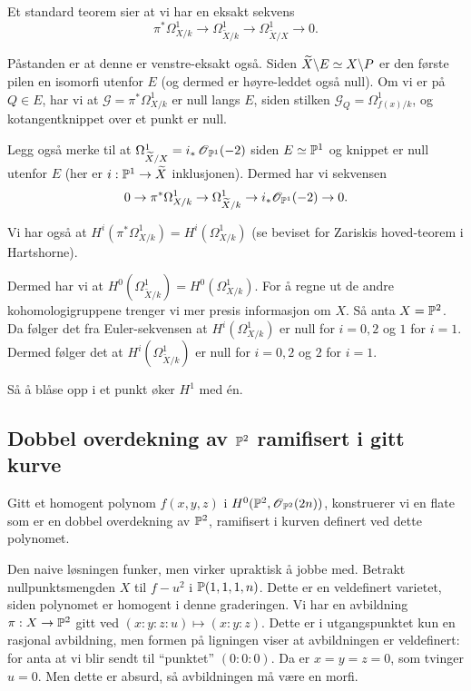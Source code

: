 \documentclass[11pt, norsk]{article}
\begin{document}
Et standard teorem sier at vi har en eksakt sekvens
$$
\pi^\ast \Omega^1_{X/k} \to \Omega^1_{\widetilde X/k} \to \Omega^1_{\widetilde X/X} \to 0.
$$

Påstanden er at denne er venstre-eksakt også. Siden $\widetilde X \backslash E \simeq X \backslash P$ er den første pilen en isomorfi utenfor $E$ (og dermed er høyre-leddet også null). Om vi er på $Q \in E$, har vi at $\mathscr G = {\pi^\ast \Omega_{X/k}^1}$ er null langs $E$, siden stilken $\mathscr G_Q=\Omega_{f(x)/k}^1$, og kotangentknippet over et punkt er null.

Legg også merke til at $\Omega^1_{\widetilde X/X}=i_\ast \operatorname{\mathscr{O}}_{\mathbb{P}^1}(-2)$ siden $E \simeq \mathbb{P}^1$ og knippet er null utenfor $E$ (her er $i:\mathbb{P}^1 \to \widetilde X$ inklusjonen). Dermed har vi sekvensen
$$
0 \to \pi^\ast \Omega^1_{X/k} \to \Omega^1_{\widetilde X/k} \to i_\ast \mathscr O_{\mathbb{P}^1} (-2) \to 0.
$$

Vi har også at $H^i(\pi^\ast \Omega^1_{X/k})= H^i(\Omega_{X/k}^1)$ (se beviset for Zariskis hoved-teorem i Hartshorne).

Dermed har vi at $H^0(\Omega_{\widetilde X/k}^1) = H^0(\Omega_{X/k}^1)$. For å regne ut de andre kohomologigruppene trenger vi mer presis informasjon om $X$. Så anta $X= \mathbb{P}^2$. Da følger det fra Euler-sekvensen at $H^i(\Omega_{X/k}^1)$ er null for $i=0,2$ og $1$ for $i=1$. Dermed følger det at $H^i(\Omega_{\widetilde X/k}^1)$ er null for $i=0,2$ og $2$ for $i=1$.

Så å blåse opp i et punkt øker $H^1$ med én.

\subsection{Dobbel overdekning av $\mathbb{P}^2$ ramifisert i gitt kurve}

Gitt et homogent polynom $f(x,y,z)$ i $H^0(\mathbb{P}^2,\operatorname{\mathscr{O}}_{\mathbb{P}^2}(2n))$, konstruerer vi en flate som er en dobbel overdekning av $\mathbb{P}^2$, ramifisert i kurven definert ved dette polynomet.

Den naive løsningen funker, men virker upraktisk å jobbe med. Betrakt nullpunktsmengden $X$ til $f-u^2$ i $\mathbb{P}(1,1,1,n)$. Dette er en veldefinert varietet, siden polynomet er homogent i denne graderingen.  Vi har en avbildning $\pi:X \to \mathbb{P}^2$ gitt ved $(x:y:z:u) \mapsto (x:y:z)$. Dette er i utgangspunktet kun en rasjonal avbildning, men formen på ligningen viser at avbildningen er veldefinert: for anta at vi blir sendt til ``punktet'' $(0:0:0)$. Da er $x=y=z=0$, som tvinger $u=0$. Men dette er absurd, så avbildningen må være en morfi.
\end{document}
